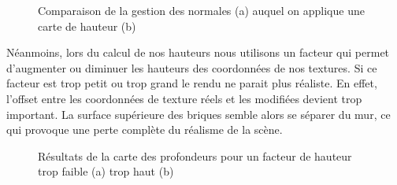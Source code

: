 \documentclass[a4paper]{article}
\begin{document}
\begin{figure}[H]
\centering
{}
\caption{Comparaison de la gestion des normales (a) auquel on applique une carte de hauteur (b)}
\end{figure}

Néanmoins, lors du calcul de nos hauteurs nous utilisons un facteur qui permet d'augmenter ou diminuer les hauteurs des coordonnées de nos textures. Si ce facteur est trop petit ou trop grand le rendu ne parait plus réaliste. En effet, l'offset entre les coordonnées de texture réels et les modifiées devient trop important. La surface supérieure des briques semble alors se séparer du mur, ce qui provoque une perte complète du réalisme de la scène.

\begin{figure}[H]
\centering
{}
\caption{Résultats de la carte des profondeurs pour un facteur de hauteur trop faible (a) trop haut (b)}
\end{figure}
\end{document}
